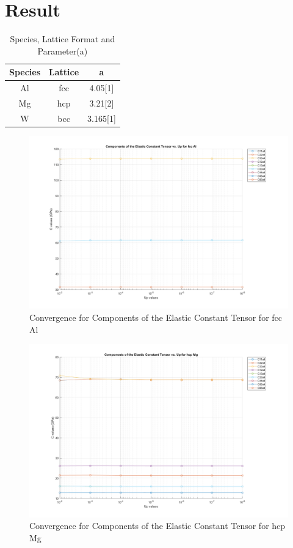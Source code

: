 \documentclass[a4paper,12pt]{article} %
\begin{document}
\section*{Result}
\begin{table}[ht]
    \caption{Species, Lattice Format and Parameter(a) }
    \centering
    \begin{tabular}{|c|c|c|}
        \hline
        Species& Lattice &a \\
        \hline   
        Al & fcc & 4.05[1] \\
        Mg & hcp & 3.21[2]\\
        W & bcc & 3.165[1]\\
        \hline
    \end{tabular}
\end{table}

\begin{figure}[ht]
    \centering
    \includegraphics[width=1.1\textwidth]{Al.png}
    \caption{Convergence for Components of the Elastic Constant Tensor for fcc Al}
\end{figure}

\begin{figure}[ht]
    \centering
    \includegraphics[width=1.1\textwidth]{Mg.png}
    \caption{Convergence for Components of the Elastic Constant Tensor for hcp Mg}
\end{figure}
\end{document}
